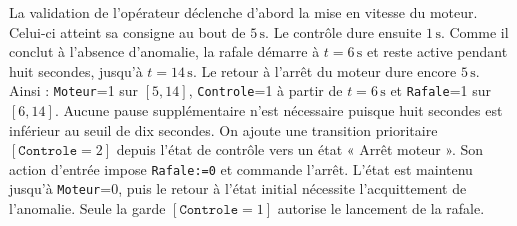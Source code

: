 \begin{corrigebox}
La validation de l'opérateur déclenche d'abord la mise en vitesse du
            moteur. Celui-ci atteint sa consigne au bout de $5\,\mathrm{s}$. Le contrôle
            dure ensuite $1\,\mathrm{s}$. Comme il conclut à l'absence d'anomalie, la
            rafale démarre à $t=6\,\mathrm{s}$ et reste active pendant huit secondes,
            jusqu'à $t=14\,\mathrm{s}$. Le retour à l'arrêt du moteur dure encore
            $5\,\mathrm{s}$. Ainsi : \texttt{Moteur}=1 sur $[5,14]$,
            \texttt{Controle}=1 à partir de $t=6\,\mathrm{s}$ et
            \texttt{Rafale}=1 sur $[6,14]$. Aucune pause supplémentaire n'est nécessaire
            puisque huit secondes est inférieur au seuil de dix secondes.
On ajoute une transition prioritaire $[\texttt{Controle}=2]$ depuis
            l'état de contrôle vers un état « Arrêt moteur ». Son action d'entrée impose
            \texttt{Rafale:=0} et commande l'arrêt. L'état est maintenu jusqu'à
            \texttt{Moteur}=0, puis le retour à l'état initial nécessite l'acquittement de
            l'anomalie. Seule la garde $[\texttt{Controle}=1]$ autorise le lancement de la
            rafale.
\end{corrigebox}

